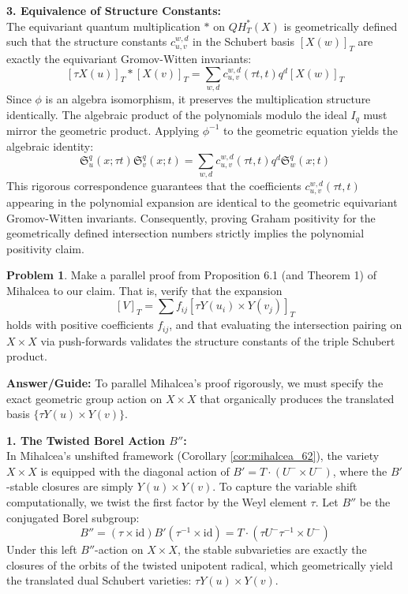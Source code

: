 \documentclass{amsart}
\theoremstyle{definition}
\newtheorem{problem}{Problem}
\begin{document}
\vspace{2mm}
\noindent\textbf{3. Equivalence of Structure Constants:}\\
The equivariant quantum multiplication $*$ on $QH_T^*(X)$ is geometrically defined such that the structure constants $c_{u,v}^{w,d}$ in the Schubert basis $[X(w)]_T$ are exactly the equivariant Gromov-Witten invariants:
$$ [\tau X(u)]_T * [X(v)]_T = \sum_{w,d} c_{u,v}^{w,d}(\tau t, t) q^d [X(w)]_T $$
Since $\phi$ is an algebra isomorphism, it preserves the multiplication structure identically. The algebraic product of the polynomials modulo the ideal $I_q$ must mirror the geometric product. Applying $\phi^{-1}$ to the geometric equation yields the algebraic identity:
$$ \mathfrak{S}_u^q(x; \tau t) \mathfrak{S}_v^q(x;t) = \sum_{w,d} c_{u,v}^{w,d}(\tau t, t) q^d \mathfrak{S}_w^q(x;t) $$
This rigorous correspondence guarantees that the coefficients $c_{u,v}^{w,d}(\tau t, t)$ appearing in the polynomial expansion are identical to the geometric equivariant Gromov-Witten invariants. Consequently, proving Graham positivity for the geometrically defined intersection numbers strictly implies the polynomial positivity claim.

\begin{problem}
Make a parallel proof from Proposition 6.1 (and Theorem 1) of Mihalcea to our claim. That is, verify that the expansion 
$$[V]_T = \sum f_{ij} [\tau Y(u_i) \times Y(v_j)]_T$$ 
holds with positive coefficients $f_{ij}$, and that evaluating the intersection pairing on $X \times X$ via push-forwards validates the structure constants of the triple Schubert product.
\end{problem}

\noindent\textbf{Answer/Guide:} 
To parallel Mihalcea's proof rigorously, we must specify the exact geometric group action on $X \times X$ that organically produces the translated basis $\{\tau Y(u) \times Y(v)\}$.

\vspace{2mm}
\noindent\textbf{1. The Twisted Borel Action $B''$:}\\
In Mihalcea's unshifted framework (Corollary \ref{cor:mihalcea_62}), the variety $X \times X$ is equipped with the diagonal action of $B' = T \cdot (U^- \times U^-)$, where the $B'$-stable closures are simply $Y(u) \times Y(v)$. To capture the variable shift computationally, we twist the first factor by the Weyl element $\tau$. Let $B''$ be the conjugated Borel subgroup:
$$ B'' = (\tau \times \mathrm{id}) B' (\tau^{-1} \times \mathrm{id}) = T \cdot (\tau U^- \tau^{-1} \times U^-) $$
Under this left $B''$-action on $X \times X$, the stable subvarieties are exactly the closures of the orbits of the twisted unipotent radical, which geometrically yield the translated dual Schubert varieties: $\tau Y(u) \times Y(v)$. 
\end{document}
